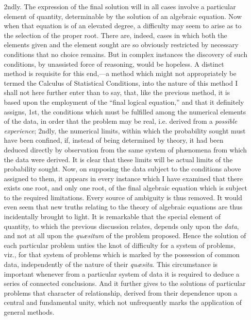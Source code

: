 \documentclass[oneside]{book}
\begin{document}
2ndly. The expression of the final solution will in all cases
involve a particular element of quantity, determinable by the solution
of an algebraic equation. Now when that equation is of
an elevated degree, a difficulty may seem to arise as to the selection
of the proper root. There are, indeed, cases in which
both the elements given and the element sought are so obviously
restricted by necessary conditions that no choice remains. But
in complex instances the discovery of such conditions, by unassisted
force of reasoning, would be hopeless. A distinct method
is requisite for this end,---a method which might not
appropriately be termed the Calculus of Statistical Conditions,
into the nature of this method I shall not here further enter
than to say, that, like the previous method, it is based upon the
employment of the ``final logical equation,'' and that it definitely
assigns, 1st, the conditions which must be fulfilled among the
numerical elements of the data, in order that the problem may
be real, i.e. derived from a \textit{possible experience}; 2ndly, the numerical
limits, within which the probability sought must have
been confined, if, instead of being determined by theory, it had
been deduced directly by observation from the same system of
ph{\ae}nomena from which the data were derived. It is clear that
these limits will be actual limits of the probability sought.
Now, on supposing the data subject to the conditions above assigned
to them, it appears in every instance which I have examined
that there exists one root, and only one root, of the final
algebraic equation which is subject to the required limitations.
Every source of ambiguity is thus removed. It would even seem
that new truths relating to the theory of algebraic equations
are thus incidentally brought to light. It is remarkable that
the special element of quantity, to which the previous discussion
relates, depends only upon the \textit{data}, and not at all upon the
\textit{qu\ae{}situm} of the problem proposed. Hence the solution of each
particular problem unties the knot of difficulty for a system of
problems, viz., for that system of problems which is marked by
the possession of common data, independently of the nature of
their \textit{qu\ae{}sita}. This circumstance is important whenever from a
particular system of data it is required to deduce a series of connected
conclusions. And it further gives to the solutions of
particular problems that character of relationship, derived from
their dependence upon a central and fundamental unity, which
not unfrequently marks the application of general methods.
\end{document}
